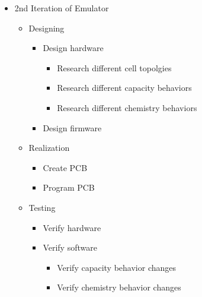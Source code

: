 \begin{itemize}
    \item 2nd Iteration of Emulator
    \begin{itemize}
        \item Designing 
        \begin{itemize}
            \item Design hardware
            \begin{itemize}
                \item Research different cell topolgies 
                \item Research different capacity behaviors 
                \item Research different chemistry behaviors
            \end{itemize}
            \item Design firmware
        \end{itemize}
        \item Realization
        \begin{itemize}
        \item Create PCB
        \item Program PCB
        \end{itemize}
        \item Testing
        \begin{itemize}
            \item Verify hardware
            \item Verify software 
            \begin{itemize}
                \item Verify capacity behavior changes
                \item Verify chemistry behavior changes
            \end{itemize}
        \end{itemize}
    \end{itemize}
\end{itemize}
